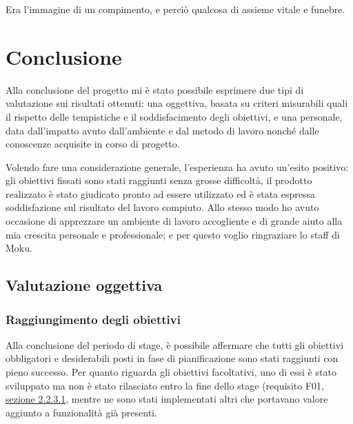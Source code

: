 \begin{savequote}[75mm]
  Era l'immagine di un compimento, e perciò qualcosa di assieme vitale e funebre.
\end{savequote}
\chapter{Conclusione}
\label{conclusion}
Alla conclusione del progetto mi è stato possibile esprimere due tipi di valutazione sui risultati ottenuti: una oggettiva, basata su criteri misurabili quali il rispetto delle tempistiche e il soddisfacimento degli obiettivi, e una personale, data dall'impatto avuto dall'ambiente e dal metodo di lavoro nonché dalle conoscenze acquisite in corso di progetto. 

Volendo fare una considerazione generale, l'esperienza ha avuto un'esito positivo: gli obiettivi fissati sono stati raggiunti senza grosse difficoltà, il prodotto realizzato è stato giudicato pronto ad essere utilizzato ed è stata espressa soddisfazione sul risultato del lavoro compiuto. Allo stesso modo ho avuto occasione di apprezzare un ambiente di lavoro accogliente e di grande aiuto alla mia crescita personale e professionale; e per questo voglio ringraziare lo staff di Moku.
\section{Valutazione oggettiva}
\subsection{Raggiungimento degli obiettivi}
Alla conclusione del periodo di stage, è possibile affermare che tutti gli obiettivi obbligatori e desiderabili posti in fase di pianificazione sono stati raggiunti con pieno successo. Per quanto riguarda gli obiettivi facoltativi, uno di essi è stato sviluppato ma non è stato rilasciato entro la fine dello stage (requisito F01, \hyperref[sec:2.2.3]{sezione 2.2.3.1}, mentre ne sono stati implementati altri che portavano valore aggiunto a funzionalità già presenti.

